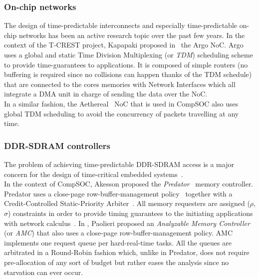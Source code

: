 \documentclass[main.tex]{subfiles}
\begin{document}
\subsubsection{On-chip networks}
The design of time-predictable interconnects and especially time-predictable on-chip networks has been an active research topic over the past few years. In the context of the T-CREST project, Kapapaki \etal proposed in~\cite{Kasapaki14} the Argo NoC. Argo uses a global and static Time Division Multiplexing (or \emph{TDM}) scheduling scheme to provide time-guarantees to applications. It is composed of simple routers (no buffering is required since no collisions can happen thanks of the TDM schedule) that are connected to the cores memories with Network Interfaces which all integrate a DMA unit in charge of sending the data over the NoC. \\

In a similar fashion, the Aethereal~\cite{Goossens2005} NoC that is used in CompSOC also uses global TDM scheduling to avoid the concurrency of packets travelling at any time.

\subsubsection{DDR-SDRAM controllers}
The problem of achieving time-predictable DDR-SDRAM access is a major concern for the design of time-critical embedded systems~\cite{Wilhelm2009}. \\

In the context of CompSOC, Akesson \etal proposed the \emph{Predator}~\cite{Akesson2007} memory controller. Predator uses a close-page row-buffer-management policy~\cite{Jacob2007} together with a Credit-Controlled Static-Priority Arbiter~\cite{Akesson2007_CCSP}. All memory requesters are assigned ($\rho$, $\sigma$) constraints in order to provide timing guarantees to the initiating applications with network calculus~\cite{Cruz91}. 
In \cite{Paolieri2009}, Paolieri \etal proposed an \emph{Analyzable Memory Controller} (or \emph{AMC}) that also uses a close-page row-buffer-management policy. AMC implements one request queue per hard-real-time tasks. All the queues are arbitrated in a Round-Robin fashion which, unlike in Predator, does not require pre-allocation of any sort of budget but rather eases the analysis since no starvation can ever occur. \\
\end{document}
